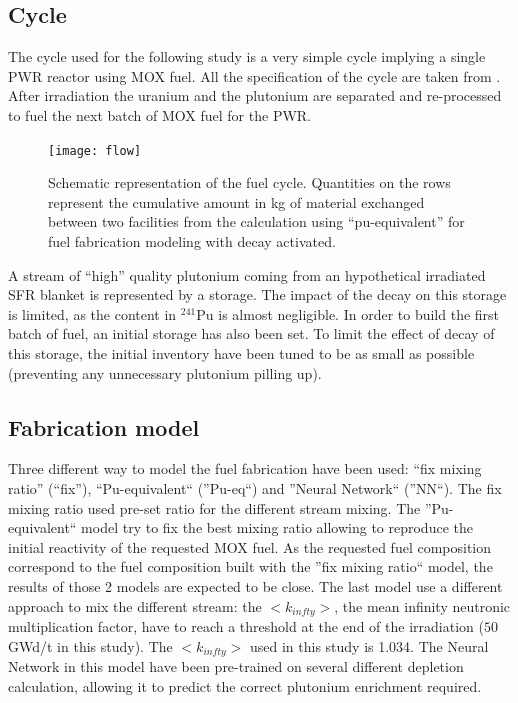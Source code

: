 \documentclass{anstrans}
\begin{document}
\subsection{Cycle} 

The cycle used for the following study is a very simple cycle
implying a single PWR reactor using MOX fuel. All the specification of the cycle
are taken from \cite{Bo}. After irradiation the uranium and the plutonium are
separated and re-processed to fuel the next batch of MOX fuel for the PWR.

\begin{figure}[ht] %
  \centering
  \texttt{[image: flow]}
  \caption{Schematic representation of the fuel cycle. Quantities on the rows
  represent the cumulative amount in kg of material exchanged between two
facilities from the calculation using ``pu-equivalent'' for fuel fabrication
modeling with decay activated.}
  \label{fig:flow}
\end{figure}

A stream of ``high'' quality plutonium coming from an hypothetical irradiated
SFR blanket is represented by a storage. The impact of the decay on this storage
is limited, as the content in $^{241}$Pu is almost negligible. In order to build
the first batch of fuel, an initial storage has also been set. To limit the
effect of decay of this storage, the initial inventory have been tuned to be as
small as possible (preventing any unnecessary plutonium pilling up).

\subsection{Fabrication model}
Three different way to model the fuel fabrication have been used: ``fix mixing
ratio'' (``fix''), ``Pu-equivalent`` (''Pu-eq``) and ''Neural Network`` (''NN``).
The fix mixing ratio used pre-set ratio for the different stream mixing. The
''Pu-equivalent`` model try to fix the best mixing ratio allowing to reproduce
the initial reactivity of the requested MOX fuel. As the requested fuel
composition correspond to the fuel composition built with the ''fix mixing
ratio`` model, the results of those 2 models are expected to be close.
The last model use a different approach to mix the different stream: the
$<k_{infty}>$, the mean infinity neutronic multiplication factor, have to reach
a threshold at the end of the irradiation ($50~$GWd/t in this study). The
$<k_{infty}>$ used in this study is 1.034. The Neural Network in this
model have been pre-trained on several different depletion calculation,
allowing it to predict the correct plutonium enrichment required.
\end{document}
